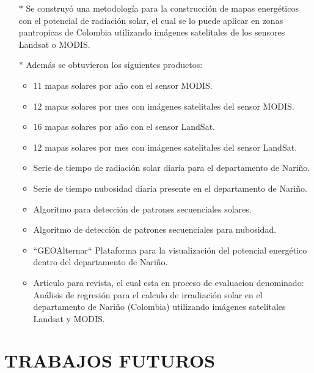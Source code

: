 \begin{itemize}
  \item[$*$]Se construyó una metodología para la construcción de mapas energéticos con el potencial de radiación solar, el cual se lo puede aplicar en zonas 
  pantropicas de Colombia utilizando imágenes satelitales de los sensores Landsat o MODIS.

  \item[$*$]Además se obtuvieron los siguientes productos:
  \begin{itemize}
    \item 11 mapas solares por año con el sensor MODIS.
    \item 12 mapas solares por mes con imágenes satelitales del sensor MODIS. 
    \item 16 mapas solares por año con el sensor LandSat.
    \item 12 mapas solares por mes con imágenes satelitales del sensor LandSat. 
    \item Serie de tiempo de radiación solar diaria para el departamento de Nariño.
    \item Serie de tiempo nubosidad diaria presente en el departamento de Nariño.
    \item Algoritmo para detección de patrones secuenciales solares.
    \item Algoritmo de detección de patrones secuenciales para nubosidad.
    \item ``GEOAlternar`` Plataforma para la visualización del potencial energético dentro del departamento de Nariño.
    \item Articulo para revista, el cual esta en proceso de evaluacion denominado: Análisis de regresión para el calculo de irradiación solar en el 
    departamento de Nariño (Colombia) utilizando imágenes satelitales Landsat y MODIS.
  \end{itemize}
\end{itemize}

\chapter{TRABAJOS FUTUROS}

